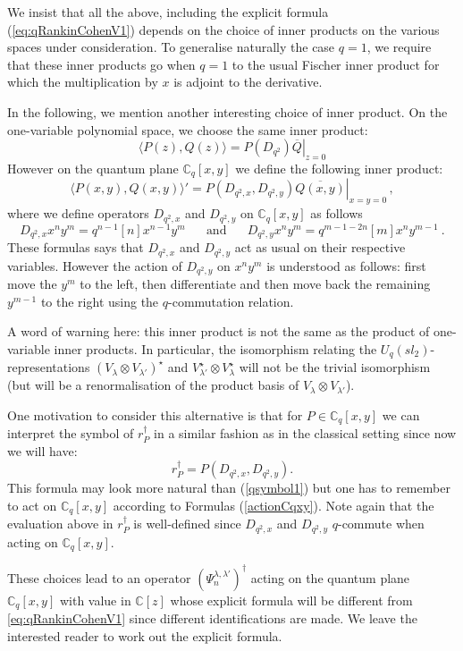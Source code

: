 \documentclass[a4paper,12pt]{article}
\numberwithin{equation}{section}
\newcommand{\C}{\mathbb{C}}
\theoremstyle{rem}
\newenvironment{rema}
  {\pushQED{\qed}\renewcommand{\qedsymbol}{$\scriptstyle{\blacktriangle}$}\remax}
  {\popQED\endremax}
\theoremstyle{definition}
\begin{document}
\begin{rema}
We insist that all the above, including the explicit formula (\ref{eq:qRankinCohenV1}) depends on the choice of inner products on the various spaces under consideration. To generalise naturally the case $q=1$, we require that these inner products go when $q=1$ to the usual Fischer inner product for which the multiplication by $x$ is adjoint to the derivative.

In the following, we mention another interesting choice of inner product. 
On the one-variable polynomial space, we choose the same inner product:
\[\langle P(z),Q(z)\rangle=\left.P(D_{q^2})\overline{Q}\right|_{z=0}\]
However on the quantum plane $\C_q[x,y]$ we define the following inner product:
    \[ 
    \langle     P(x,y),Q(x,y)\rangle'=\left.P(D_{q^{2},x},D_{q^{2},y})\overline{Q(x,y)}\right|_{x=y=0}\,, 
    \]
where we define operators $D_{q^{2},x}$ and
$D_{q^{2},y}$ on $\C_q[x,y]$ as follows
\begin{equation}\label{actionCqxy}
D_{q^{2},x}x^ny^m=q^{n-1}[n]x^{n-1}y^m\ \ \ \quad\text{and}\quad\ \ \ D_{q^{2},y}x^ny^m=q^{m-1-2n}[m]x^{n}y^{m-1}\ .\end{equation}
These formulas says that $D_{q^{2},x}$ and $D_{q^{2},y}$ act as usual on their respective variables. However the action of $D_{q^{2},y}$ on $x^ny^m$ is understood as follows: first move the $y^m$ to the left, then differentiate and then move back the remaining $y^{m-1}$ to the right using the $q$-commutation relation.

A word of warning here: this inner product is not the same as the product of one-variable inner products. In particular, the isomorphism relating the $U_q(sl_2)$-representations $(V_\lambda\otimes V_{\lambda'})^\star$ and $V_{\lambda'}^\star\otimes V_\lambda^\star$ will not be the trivial isomorphism (but will be a renormalisation of the product basis of $V_\lambda\otimes V_{\lambda'}$).

One motivation to consider this alternative is that for $P\in \C_q[x,y]$ we can interpret the symbol of $r_{P}^\dagger$ in a similar fashion as in the classical setting since now we will have:
\[
r_P^\dagger =P(D_{q^{2},x},D_{q^{2},y}).
\] 
This formula may look more natural than (\ref{qsymbol1}) but one has to remember to act on $\C_q[x,y]$ according to Formulas (\ref{actionCqxy}). Note again that  the evaluation above in $r_P^{\dagger}$ is well-defined since $D_{q^{2},x}$ and $D_{q^{2},y}$ $q$-commute when acting on $\C_q[x,y]$.

These choices lead to an operator $\left(\Psi_n^{\lambda,\lambda'}\right)^\dagger$ acting on the quantum plane $\C_q[x,y]$ with value in $\C[z]$ whose explicit formula will be different from \eqref{eq:qRankinCohenV1} since different identifications are made. We leave the interested reader to work out the explicit formula.
\end{rema}
    
\end{document}
